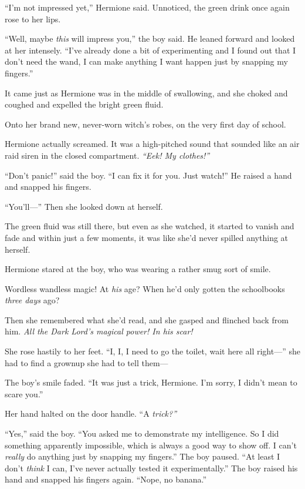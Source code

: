 ``I'm not impressed yet,'' Hermione said. Unnoticed, the green drink
once again rose to her lips.

``Well, maybe \emph{this} will impress you,'' the boy said. He leaned
forward and looked at her intensely. ``I've already done a bit of
experimenting and I found out that I don't need the wand, I can make
anything I want happen just by snapping my fingers.''

It came just as Hermione was in the middle of swallowing, and she choked
and coughed and expelled the bright green fluid.

Onto her brand new, never-worn witch's robes, on the very first day of
school.

Hermione actually screamed. It was a high-pitched sound that sounded
like an air raid siren in the closed compartment. \emph{``Eek! My
clothes!''}

``Don't panic!'' said the boy. ``I can fix it for you. Just watch!'' He
raised a hand and snapped his fingers.

``You'll---'' Then she looked down at herself.

The green fluid was still there, but even as she watched, it started to
vanish and fade and within just a few moments, it was like she'd never
spilled anything at herself.

Hermione stared at the boy, who was wearing a rather smug sort of smile.

Wordless wandless magic! At \emph{his} age? When he'd only gotten the
schoolbooks \emph{three days} ago?

Then she remembered what she'd read, and she gasped and flinched back
from him. \emph{All the Dark Lord's magical power! In his scar!}

She rose hastily to her feet. ``I, I, I need to go the toilet, wait here
all right---'' she had to find a grownup she had to tell them---

The boy's smile faded. ``It was just a trick, Hermione. I'm sorry, I
didn't mean to scare you.''

Her hand halted on the door handle. ``A \emph{trick?''}

``Yes,'' said the boy. ``You asked me to demonstrate my intelligence. So
I did something apparently impossible, which is always a good way to
show off. I can't \emph{really} do anything just by snapping my
fingers.'' The boy paused. ``At least I don't \emph{think} I can, I've
never actually tested it experimentally.'' The boy raised his hand and
snapped his fingers again. ``Nope, no banana.''

